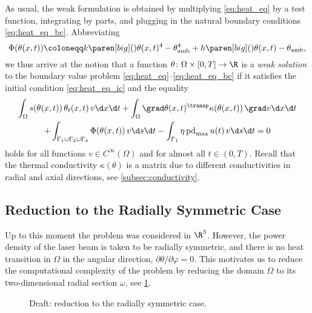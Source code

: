 As usual, the weak formulation is obtained by multiplying \eqref{eq:heat_eq} by a test function, integrating by parts, and plugging in the natural boundary conditions \eqref{eq:heat_eq_bc}.
Abbreviating
\begin{equation*}
	\Phi(\theta(x,t)) 
	\coloneqq 
	k \paren[big](){\theta(x,t)^4 - \theta_\textup{amb}^4} + h \paren[big](){\theta(x,t) - \theta_\textup{amb}}
	,
\end{equation*}
we thus arrive at the notion that a function $\theta \colon \Omega \times [0,T] \to \R$ is a \emph{weak solution} to the boundary value problem \eqref{eq:heat_eq}--\eqref{eq:heat_eq_bc} if it satisfies the initial condition \eqref{eq:heat_eq_ic} and the equality
\begin{multline} \label{eq:weak}
	\int_\Omega s(\theta(x,t)) \, \theta_t(x,t) \, v \d x \d t
	+
	\int_\Omega \grad \theta(x,t)^\transp \kappa(\theta(x,t)) \, \grad v \d x \d t 
	\\
	+
	\int_{\Gamma_1 \cup \Gamma_2 \cup \Gamma_4} \Phi(\theta(x,t))\, v\d s \d t -
	\int_{\Gamma_1} \eta \, \text{pd}_{\max} \, u(t) \, v \d s \d t 
	= 
	0
\end{multline}
holds for all functions $v \in C^\infty(\Omega)$ and for almost all $t \in (0,T)$.
Recall that the thermal conductivity $\kappa(\theta)$ is a matrix due to different conductivities in radial and axial directions, see \cref{subsec:conductivity}.


\subsection{Reduction to the Radially Symmetric Case}

Up to this moment the problem was considered in $\R^3$.
However, the power density of the laser beam is taken to be radially symmetric, and there is no heat transition in $\Omega$ in the angular direction, \ie $\partial\theta/\partial\varphi = 0$. 
This motivates us to reduce the computational complexity of the problem by reducing the domain $\Omega$ to its two-dimensional radial section $\omega$, see \cref{fig:sec}.

\begin{figure}
	\centering
	
	
	\caption{Draft: reduction to the radially symmetric case.}
	\label{fig:sec}
\end{figure}

